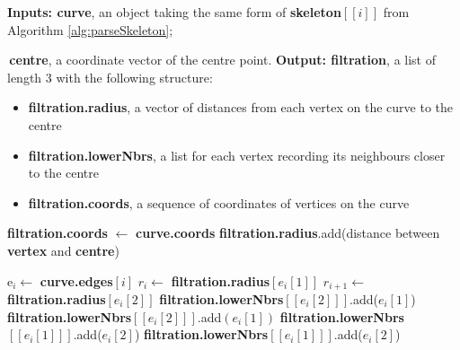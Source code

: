 \documentclass[a4paper,11pt]{article}
\theoremstyle{definition}
\begin{document}
\begin{algorithm}[H]
\caption{\textbf{computeRadialFiltration.} Compute radial filtration for the given skeleton for some fixed centre point.}\label{alg:computeRadialFiltration}
\begin{algorithmic}
\State \textbf{Inputs: curve}, an object taking the same form of \textbf{skeleton$[[i]]$} from Algorithm \ref{alg:parseSkeleton};

\;\;\;\;\;\;\;\,\textbf{centre}, a coordinate vector of the centre point.
\State \textbf{Output: filtration}, a list of length 3 with the following structure:
\begin{itemize}
    \item \textbf{filtration.radius}, a vector of distances from each vertex on the curve to the centre
    \item \textbf{filtration.lowerNbrs}, a list for each vertex recording its neighbours closer to the centre
    \item \textbf{filtration.coords}, a sequence of coordinates of vertices on the curve
\end{itemize}

\vspace{0.2cm}
\State \textbf{filtration.coords} $\gets$ \textbf{curve.coords}
\State \textbf{filtration.radius}.add(distance between \textbf{vertex} and \textbf{centre})
\EndFor
{} \end{algorithmic} \end{algorithm}

\begin{algorithm}[H]
\begin{algorithmic}
\State e$_i \gets$ \textbf{curve.edges}$[i]$ 
\State $r_i \gets$ \textbf{filtration.radius}$[e_i[1]] $
\State $r_{i+1} \gets$ \textbf{filtration.radius}$[e_i[2]]$
    \State \textbf{filtration.lowerNbrs}$[[e_i[2]]]$.add($e_i[1]$)
     
    \State \textbf{filtration.lowerNbrs}$[[e_i[2]]]$.add$(e_i[1])$
    \Else
    \State \textbf{filtration.lowerNbrs}$[[e_i[1]]]$.add($e_i[2]$)
    \EndIf
\Else
    \State \textbf{filtration.lowerNbrs}$[[e_i[1]]]$.add($e_i[2]$)
\EndIf
\EndFor
\end{algorithmic}
\end{algorithm}
\end{document}
